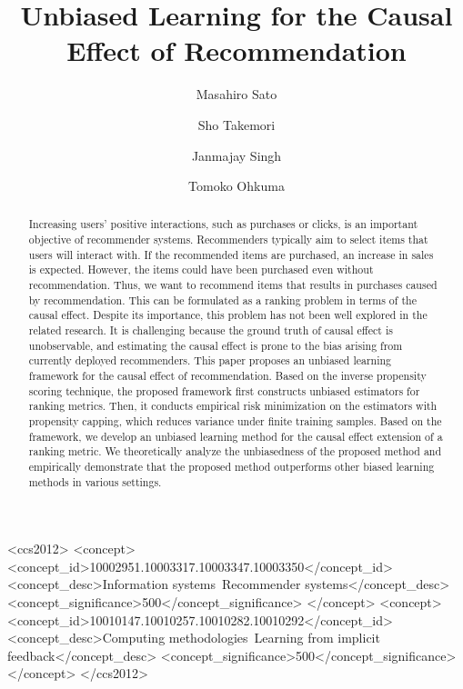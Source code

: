 \documentclass[manuscript,screen]{acmart}
\begin{document}
\title{Unbiased Learning for the Causal Effect of Recommendation}


\author{Masahiro Sato}

\author{Sho Takemori}

\author{Janmajay Singh}

\author{Tomoko Ohkuma}


\renewcommand{\shortauthors}{M. Sato, et al.}


\begin{abstract}
	Increasing users' positive interactions, such as purchases or clicks, is an important objective of recommender systems.
	Recommenders typically aim to select items that users will interact with.
	If the recommended items are purchased, an increase in sales is expected.
	However, the items could have been purchased even without recommendation.
	Thus, we want to recommend items that results in purchases caused by recommendation.
	This can be formulated as a ranking problem in terms of the causal effect.
	Despite its importance, this problem has not been well explored in the related research.
	It is challenging because the ground truth of causal effect is unobservable, and estimating the causal effect is prone to the bias arising from currently deployed recommenders.
	This paper proposes an unbiased learning framework for the causal effect of recommendation.
	Based on the inverse propensity scoring technique, the proposed framework first constructs unbiased estimators for ranking metrics.
	Then, it conducts empirical risk minimization on the estimators with propensity capping, which reduces variance under finite training samples.
	Based on the framework, we develop an unbiased learning method for the causal effect extension of a ranking metric.
	We theoretically analyze the unbiasedness of the proposed method and empirically demonstrate that the proposed method outperforms other biased learning methods in various settings.
\end{abstract}

\begin{CCSXML}
	<ccs2012>
	<concept>
	<concept_id>10002951.10003317.10003347.10003350</concept_id>
	<concept_desc>Information systems~Recommender systems</concept_desc>
	<concept_significance>500</concept_significance>
	</concept>
	<concept>
	<concept_id>10010147.10010257.10010282.10010292</concept_id>
	<concept_desc>Computing methodologies~Learning from implicit feedback</concept_desc>
	<concept_significance>500</concept_significance>
	</concept>
	</ccs2012>
\end{CCSXML}
\end{document}

